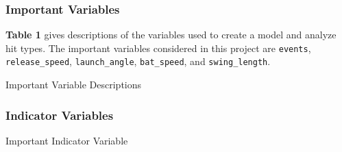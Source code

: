 \documentclass[
  letterpaper,
  DIV=11,
  numbers=noendperiod]{scrartcl}
\begin{document}
\subsubsection{Important Variables}\label{important-variables}

\textbf{Table 1} gives descriptions of the variables used to create a
model and analyze hit types. The important variables considered in this
project are \texttt{events}, \texttt{release\_speed},
\texttt{launch\_angle}, \texttt{bat\_speed}, and \texttt{swing\_length}.

\begin{table}

\caption{\label{tbl-1}Important Variable Descriptions}


\end{table}%

\subsubsection{Indicator Variables}\label{indicator-variables}

\begin{table}

\caption{\label{tbl-2}Important Indicator Variable}


\end{table}%
\end{document}
